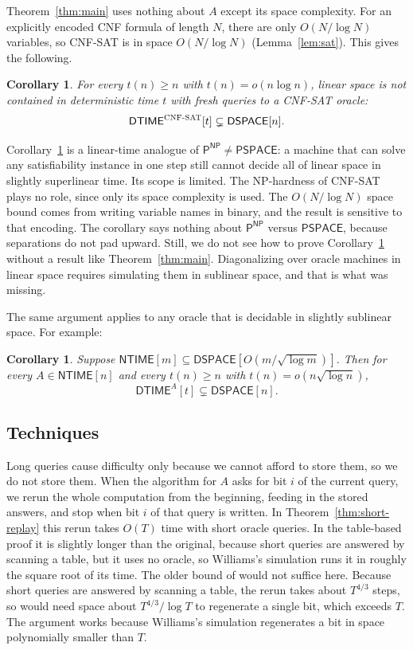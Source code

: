 \documentclass[11pt]{article}
\newtheorem{corollary}[theorem]{Corollary}
\theoremstyle{remark}
\newcommand{\DTIME}{\mathsf{DTIME}}
\newcommand{\DSPACE}{\mathsf{DSPACE}}
\newcommand{\NTIME}{\mathsf{NTIME}}
\newcommand{\SAT}{\textup{\textsc{CNF-SAT}}}
\begin{document}
Theorem~\ref{thm:main} uses nothing about $A$ except its space
complexity. For an explicitly encoded CNF formula of length $N$, there
are only $O(N/\log N)$ variables, so \SAT{} is in space $O(N/\log N)$
(Lemma~\ref{lem:sat}). This gives the following.

\begin{corollary}\label{cor:sat}
For every $t(n)\ge n$ with $t(n)=o(n\log n)$, linear space is not
contained in deterministic time $t$ with fresh queries to a \SAT{} oracle:
\[
\DTIME^{\SAT}[t]\subsetneq\DSPACE[n].
\]
\end{corollary}

Corollary~\ref{cor:sat} is a linear-time analogue of
$\mathsf{P}^{\mathsf{NP}}\neq\mathsf{PSPACE}$: a machine that can solve
any satisfiability instance in one step still cannot decide all of
linear space in slightly superlinear time. Its scope is limited. The
NP-hardness of \SAT{} plays no role, since only its space complexity is
used. The $O(N/\log N)$ space bound comes from writing variable names in
binary, and the result is sensitive to that encoding. The corollary says
nothing about $\mathsf{P}^{\mathsf{NP}}$ versus $\mathsf{PSPACE}$, because
separations do not pad upward. Still, we do not see how to prove
Corollary~\ref{cor:sat} without a result like Theorem~\ref{thm:main}.
Diagonalizing over oracle machines in linear space requires simulating
them in sublinear space, and that is what was missing.

The same argument applies to any oracle that is decidable in slightly
sublinear space. For example:

\begin{corollary}\label{cor:ntime}
Suppose $\NTIME[m]\subseteq\DSPACE[O(m/\sqrt{\log m})]$. Then for every
$A\in\NTIME[n]$ and every $t(n)\ge n$ with $t(n)=o(n\sqrt{\log n})$,
\[
\DTIME^{A}[t]\subsetneq\DSPACE[n].
\]
\end{corollary}

\subsection{Techniques}
Long queries cause difficulty only because we cannot afford to store
them, so we do not store them. When the algorithm for $A$ asks for bit
$i$ of the current query, we rerun the whole computation from the
beginning, feeding in the stored answers, and stop when bit $i$ of that
query is written. In Theorem~\ref{thm:short-replay} this rerun takes
$O(T)$ time with short oracle queries. In the table-based proof it is
slightly longer than the original, because short queries are answered by
scanning a table, but it uses no oracle, so Williams's simulation runs it
in roughly the square root of its time. The older bound of \cite{HPV}
would not suffice here. Because short queries are answered by scanning a
table, the rerun takes about $T^{4/3}$ steps, so \cite{HPV} would need
space about $T^{4/3}/\log T$ to regenerate a single bit, which exceeds
$T$. The argument works because Williams's simulation regenerates a bit in
space polynomially smaller than $T$.
\end{document}
